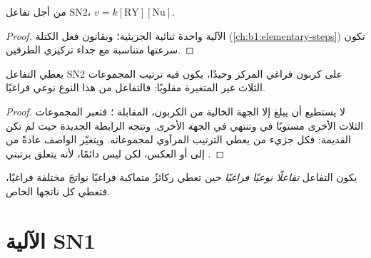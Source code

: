 \begin{proposition}\label{prop:b1:nucleophilic-substitution:sn2-law}
من أجل تفاعل SN2، $v = k[\mathrm{RY}][\mathrm{Nu}]$.
\end{proposition}

\begin{proof}
الآلية  واحدة ثنائية الجزيئية؛ وبقانون فعل الكتلة
 (\cref{ch:b1:elementary-steps}) تكون سرعتها
متناسبة مع جداء تركيزي الطرفين.
\end{proof}

\begin{proposition}\label{prop:b1:nucleophilic-substitution:sn2-inversion}
يعطي التفاعل SN2 على كربون فراغي المركز  وحيدًا، يكون فيه
ترتيب المجموعات الثلاث غير المتغيرة مقلوبًا: فالتفاعل من هذا
النوع نوعي فراغيًا.
\end{proposition}

\begin{proof}
لا يستطيع  أن يبلغ إلا الجهة الخالية من الكربون، المقابلة
؛ فتعبر المجموعات الثلاث الأخرى مستويًا في
 وتنتهي في الجهة الأخرى. وتتجه الرابطة الجديدة حيث
لم تكن القديمة: فكل جزيء من  يعطي الترتيب المرآوي
لمجموعاته. ويتغيّر الواصف عادةً من 
إلى  أو العكس، لكن ليس دائمًا، لأنه يتعلق برتبتي
 .
\end{proof}

\begin{definition}\label{def:b1:nucleophilic-substitution:stereospecific}
يكون التفاعل \emph{تفاعلًا نوعيًا فراغيًا}
حين تعطي ركائزُ متماكبة فراغيًا نواتجَ مختلفة
فراغيًا، فتعطي كل  ناتجها الخاص.
\end{definition}

\section{الآلية SN1}

